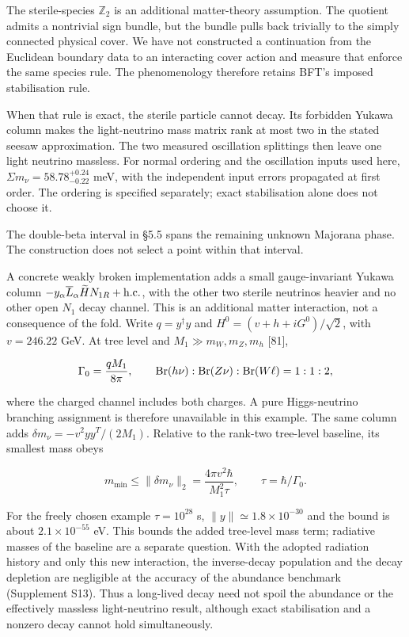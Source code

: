 \documentclass[
]{article}
\begin{document}
The sterile-species \(\mathbb Z_2\) is an additional matter-theory
assumption. The quotient admits a nontrivial sign bundle, but the bundle
pulls back trivially to the simply connected physical cover. We have not
constructed a continuation from the Euclidean boundary data to an
interacting cover action and measure that enforce the same species rule.
The phenomenology therefore retains BFT's imposed stabilisation rule.

When that rule is exact, the sterile particle cannot decay. Its
forbidden Yukawa column makes the light-neutrino mass matrix rank at
most two in the stated seesaw approximation. The two measured
oscillation splittings then leave one light neutrino massless. For
normal ordering and the oscillation inputs used here,
\(\Sigma m_\nu=58.78^{+0.24}_{-0.22}\) meV, with the independent input
errors propagated at first order. The ordering is specified separately;
exact stabilisation alone does not choose it.

The double-beta interval in §5.5 spans the remaining unknown Majorana
phase. The construction does not select a point within that interval.

A concrete weakly broken implementation adds a small gauge-invariant
Yukawa column
\(-y_\alpha\overline L_\alpha\widetilde H N_{1R}+{\rm h.c.}\), with the
other two sterile neutrinos heavier and no other open \(N_1\) decay
channel. This is an additional matter interaction, not a consequence of
the fold. Write \(q=y^\dagger y\) and \(H^0=(v+h+iG^0)/\sqrt2\), with
\(v=246.22\) GeV. At tree level and \(M_1\gg m_W,m_Z,m_h\) {[}81{]},

\[
\Gamma_0=\frac{qM_1}{8\pi},\qquad
{\rm Br}(h\nu):{\rm Br}(Z\nu):{\rm Br}(W\ell)=1:1:2,
\]

where the charged channel includes both charges. A pure Higgs-neutrino
branching assignment is therefore unavailable in this example. The same
column adds \(\delta m_\nu=-v^2yy^T/(2M_1)\). Relative to the rank-two
tree-level baseline, its smallest mass obeys

\[
m_{\min}\leq\|\delta m_\nu\|_2
=\frac{4\pi v^2\hbar}{M_1^2\tau},\qquad \tau=\hbar/\Gamma_0.
\]

For the freely chosen example \(\tau=10^{28}\) s,
\(\|y\|\simeq1.8\times10^{-30}\) and the bound is about
\(2.1\times10^{-55}\) eV. This bounds the added tree-level mass term;
radiative masses of the baseline are a separate question. With the
adopted radiation history and only this new interaction, the
inverse-decay population and the decay depletion are negligible at the
accuracy of the abundance benchmark (Supplement S13). Thus a long-lived
decay need not spoil the abundance or the effectively massless
light-neutrino result, although exact stabilisation and a nonzero decay
cannot hold simultaneously.
\end{document}
